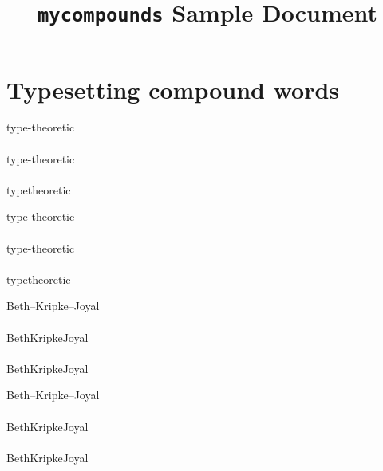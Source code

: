 \documentclass{article}
\begin{document}
\title{\texttt{mycompounds} Sample Document}
\author{}
\date{}

\maketitle

\begin{verbatim*}
\usepackage{mycompounds}
\end{verbatim*}

\section{Typesetting compound words}

\begin{verbatim*}
\begin{minipage}{0pt}
type-theoretic\\\\
type\hyp{}theoretic\\\\
type\nbhyp{}theoretic\\
\end{minipage}
\end{verbatim*}
%
\begin{minipage}{0pt}
  type-theoretic\\\\
  type\hyp{}theoretic\\\\
  type\nbhyp{}theoretic\\
\end{minipage}

\begin{verbatim*}
\begin{minipage}{0pt}
Beth--Kripke--Joyal\\\\
Beth\ndash{}Kripke\ndash{}Joyal\\\\
Beth\nbndash{}Kripke\nbndash{}Joyal\\
\end{minipage}
\end{verbatim*}
%
\begin{minipage}{0pt}
  Beth--Kripke--Joyal\\\\
  Beth\ndash{}Kripke\ndash{}Joyal\\\\
  Beth\nbndash{}Kripke\nbndash{}Joyal\\
\end{minipage}
\end{document}
